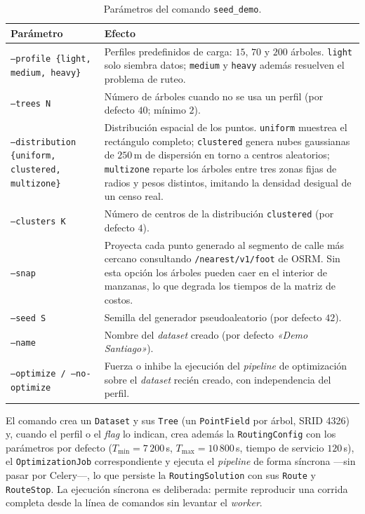 \begin{table}[H]
  \centering
  \caption{Parámetros del comando \texttt{seed\_demo}.}
  \label{tab:anexo_seed_demo}
  \small
  \begin{tabularx}{\textwidth}{@{}p{5.5cm} X@{}}
    \toprule
    Parámetro & Efecto \\
    \midrule
    \texttt{--profile \{light, medium, heavy\}} & Perfiles predefinidos de carga: $15$, $70$ y $200$ árboles. \texttt{light} solo siembra datos; \texttt{medium} y \texttt{heavy} además resuelven el problema de ruteo. \\
    \texttt{--trees N}                          & Número de árboles cuando no se usa un perfil (por defecto $40$; mínimo $2$). \\
    \texttt{--distribution \{uniform, clustered, multizone\}} & Distribución espacial de los puntos. \texttt{uniform} muestrea el rectángulo completo; \texttt{clustered} genera nubes gaussianas de $250$\,m de dispersión en torno a centros aleatorios; \texttt{multizone} reparte los árboles entre tres zonas fijas de radios y pesos distintos, imitando la densidad desigual de un censo real. \\
    \texttt{--clusters K}                       & Número de centros de la distribución \texttt{clustered} (por defecto $4$). \\
    \texttt{--snap}                             & Proyecta cada punto generado al segmento de calle más cercano consultando \texttt{/nearest/v1/foot} de OSRM. Sin esta opción los árboles pueden caer en el interior de manzanas, lo que degrada los tiempos de la matriz de costos. \\
    \texttt{--seed S}                           & Semilla del generador pseudoaleatorio (por defecto $42$). \\
    \texttt{--name}                             & Nombre del \textit{dataset} creado (por defecto \textit{«Demo Santiago»}). \\
    \texttt{--optimize / --no-optimize}         & Fuerza o inhibe la ejecución del \textit{pipeline} de optimización sobre el \textit{dataset} recién creado, con independencia del perfil. \\
    \bottomrule
  \end{tabularx}
\end{table}

El comando crea un \texttt{Dataset} y sus \texttt{Tree} (un \texttt{PointField} por
árbol, SRID 4326) y, cuando el perfil o el \textit{flag} lo indican, crea además la
\texttt{RoutingConfig} con los parámetros por defecto ($T_{\min} = 7\,200$\,s,
$T_{\max} = 10\,800$\,s, tiempo de servicio $120$\,s), el \texttt{OptimizationJob}
correspondiente y ejecuta el \textit{pipeline} de forma síncrona ---sin pasar por
Celery---, lo que persiste la \texttt{RoutingSolution} con sus \texttt{Route} y
\texttt{RouteStop}. La ejecución síncrona es deliberada: permite reproducir una
corrida completa desde la línea de comandos sin levantar el \textit{worker}.

